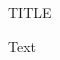 \documentclass[11pt,oneside,a4paper]{article}
\begin{document}
\begin{center}
  \uppercase{Title}
\end{center}

\noindent
Text
\end{document}
